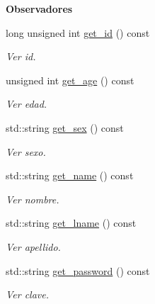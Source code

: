 \begin{Indent}{\bf Observadores}\par
\begin{DoxyCompactItemize}
\item 
long unsigned int \hyperlink{class_cuser_a06efeb2dbb2bbccab0e8997eebd2da47}{get\+\_\+id} () const 
\begin{DoxyCompactList}\small\item\em Ver id. \end{DoxyCompactList}\item 
unsigned int \hyperlink{class_cuser_a8611793c31edced138685b0d1989dc3c}{get\+\_\+age} () const 
\begin{DoxyCompactList}\small\item\em Ver edad. \end{DoxyCompactList}\item 
std\+::string \hyperlink{class_cuser_a5847a7846126a599ff20d32fd82f0105}{get\+\_\+sex} () const 
\begin{DoxyCompactList}\small\item\em Ver sexo. \end{DoxyCompactList}\item 
std\+::string \hyperlink{class_cuser_a34ee78b8655c4439528e1d63a5974683}{get\+\_\+name} () const 
\begin{DoxyCompactList}\small\item\em Ver nombre. \end{DoxyCompactList}\item 
std\+::string \hyperlink{class_cuser_afa69506b9d0b6aa61a669c20e7e4862d}{get\+\_\+lname} () const 
\begin{DoxyCompactList}\small\item\em Ver apellido. \end{DoxyCompactList}\item 
std\+::string \hyperlink{class_cuser_ac5b9b699501987e6fc957366a81a1248}{get\+\_\+password} () const 
\begin{DoxyCompactList}\small\item\em Ver clave. \end{DoxyCompactList}\end{DoxyCompactItemize}
\end{Indent}
